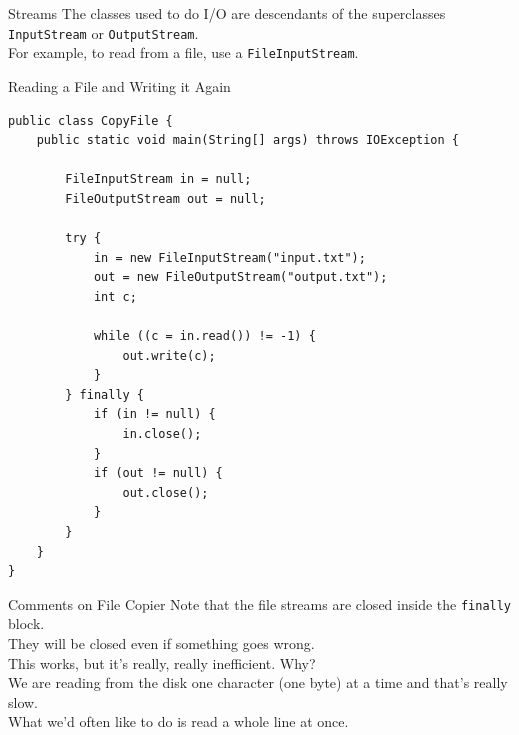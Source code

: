 \documentclass[aspectratio=169]{beamer}
\begin{document}
\begin{frame}{Streams}
The classes used to do I/O are descendants of the superclasses \texttt{InputStream} or \texttt{OutputStream}.  \\
For example, to read from a file, use a \texttt{FileInputStream}. 
\end{frame}



\begin{frame}[fragile]{Reading a File and Writing it Again}
\begin{Verbatim}[fontsize=\tiny]
public class CopyFile {
    public static void main(String[] args) throws IOException {

        FileInputStream in = null;
        FileOutputStream out = null;

        try {
            in = new FileInputStream("input.txt");
            out = new FileOutputStream("output.txt");
            int c;

            while ((c = in.read()) != -1) {
                out.write(c);
            }
        } finally {
            if (in != null) {
                in.close();
            }
            if (out != null) {
                out.close();
            }
        }
    }
}
\end{Verbatim}
\end{frame}



\begin{frame}{Comments on File Copier}
Note that the file streams are closed inside the \texttt{finally} block. \\
They will be closed even if something goes wrong. \\
This works, but it's really, really inefficient. Why? \\
We are reading from the disk one character (one byte) at a time and that's really slow. \\
What we'd often like to do is read a whole line at once. \\
\end{frame}
\end{document}
